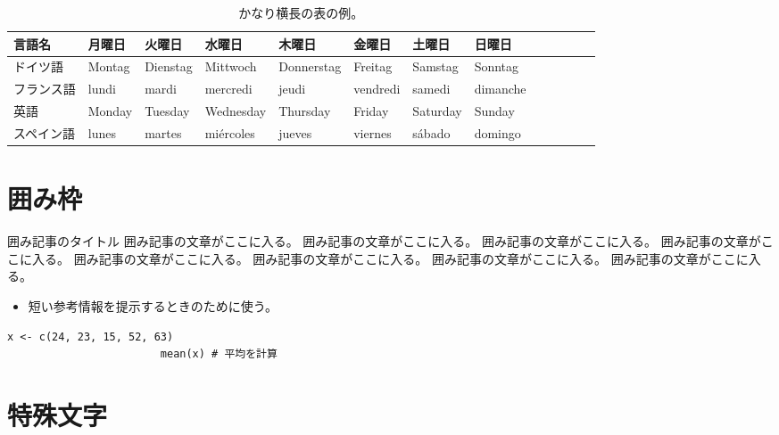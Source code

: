 \documentclass[ %
	uplatex,%
	a5paper,%
	papersize%
	]{jsbook}
\newcommand{\sanko}[1]{%
					\begin{itemize}
						\item[\mysbox{\small\gtfamily 参考}] #1
					\end{itemize}
					}
\begin{document}
						\begin{landscape}
							\begin{table}
								\caption{かなり横長の表の例。}
								\label{tb:wide-table-example}
								\begin{center}
									\begin{tabular}{lllllllllllll} \toprule
										言語名   & 月曜日     & 火曜日      & 水曜日       & 木曜日        & 金曜日       & 土曜日      & 日曜日      \\ \midrule
										ドイツ語  & Montag  & Dienstag & Mittwoch  & Donnerstag & Freitag   & Samstag  & Sonntag  \\
										フランス語 & lundi   & mardi    & mercredi  & jeudi      & vendredi  & samedi   & dimanche \\
										英語    & Monday  & Tuesday  & Wednesday & Thursday   & Friday    & Saturday & Sunday   \\
										スペイン語 & lunes   & martes   & miércoles & jueves     & viernes   & sábado   & domingo  \\ \bottomrule
									\end{tabular}
								\end{center}
							\end{table}
						\end{landscape}

						\section{囲み枠}

						\begin{note}{囲み記事のタイトル}
							囲み記事の文章がここに入る。
							囲み記事の文章がここに入る。
							囲み記事の文章がここに入る。
							囲み記事の文章がここに入る。
							囲み記事の文章がここに入る。
							囲み記事の文章がここに入る。
							囲み記事の文章がここに入る。
							囲み記事の文章がここに入る。
						\end{note}


						\sanko{短い参考情報を提示するときのために使う。}

						\begin{lstlisting}[caption=簡単なプログラムの例, label=ls:example]
						x <- c(24, 23, 15, 52, 63)
						mean(x) # 平均を計算
						\end{lstlisting}


						\section{特殊文字}
\end{document}
